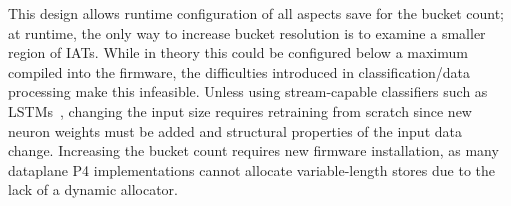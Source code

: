 

This design allows runtime configuration of all aspects save for the bucket count; at runtime, the only way to increase bucket resolution is to examine a smaller region of IATs.
While in theory this could be configured below a maximum compiled into the firmware, the difficulties introduced in classification/data processing make this infeasible.
Unless using stream-capable classifiers such as LSTMs~\parencite{DBLP:journals/neco/HochreiterS97}, changing the input size requires retraining from scratch since new neuron weights must be added and structural properties of the input data change.
Increasing the bucket count requires new firmware installation, as many dataplane P4 implementations cannot allocate variable-length stores due to the lack of a dynamic allocator.

